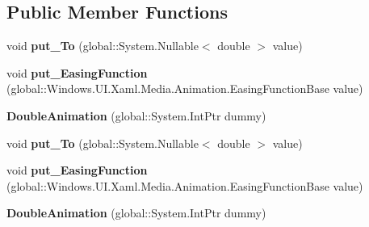 \subsection*{Public Member Functions}
\begin{DoxyCompactItemize}
\item 
\mbox{\label{class_windows_1_1_u_i_1_1_xaml_1_1_media_1_1_animation_1_1_double_animation_afcdd6d701faaf6f7f90dbe5bc32ca637}} 
void {\bfseries put\+\_\+\+To} (global\+::\+System.\+Nullable$<$ double $>$ value)
\item 
\mbox{\label{class_windows_1_1_u_i_1_1_xaml_1_1_media_1_1_animation_1_1_double_animation_ae33c4929417c9a4a374d2d89fe8e28b5}} 
void {\bfseries put\+\_\+\+Easing\+Function} (global\+::\+Windows.\+U\+I.\+Xaml.\+Media.\+Animation.\+Easing\+Function\+Base value)
\item 
\mbox{\label{class_windows_1_1_u_i_1_1_xaml_1_1_media_1_1_animation_1_1_double_animation_a099940779e3426c3188f5741e607d183}} 
{\bfseries Double\+Animation} (global\+::\+System.\+Int\+Ptr dummy)
\item 
\mbox{\label{class_windows_1_1_u_i_1_1_xaml_1_1_media_1_1_animation_1_1_double_animation_afcdd6d701faaf6f7f90dbe5bc32ca637}} 
void {\bfseries put\+\_\+\+To} (global\+::\+System.\+Nullable$<$ double $>$ value)
\item 
\mbox{\label{class_windows_1_1_u_i_1_1_xaml_1_1_media_1_1_animation_1_1_double_animation_ae33c4929417c9a4a374d2d89fe8e28b5}} 
void {\bfseries put\+\_\+\+Easing\+Function} (global\+::\+Windows.\+U\+I.\+Xaml.\+Media.\+Animation.\+Easing\+Function\+Base value)
\item 
\mbox{\label{class_windows_1_1_u_i_1_1_xaml_1_1_media_1_1_animation_1_1_double_animation_a099940779e3426c3188f5741e607d183}} 
{\bfseries Double\+Animation} (global\+::\+System.\+Int\+Ptr dummy)

\end{DoxyCompactItemize}
